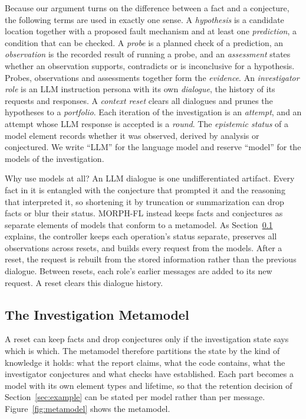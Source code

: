 \documentclass[a4paper,fleqn]{cas-sc}
\newcommand{\tool}{MORPH-FL}
\begin{document}
Because our argument turns on the difference between a fact and a conjecture, the following terms are used in exactly one sense. A \emph{hypothesis} is a candidate location together with a proposed fault mechanism and at least one \emph{prediction}, a condition that can be checked. A \emph{probe} is a planned check of a prediction, an \emph{observation} is the recorded result of running a probe, and an \emph{assessment} states whether an observation supports, contradicts or is inconclusive for a hypothesis. Probes, observations and assessments together form the \emph{evidence}. An \emph{investigator role} is an LLM instruction persona with its own \emph{dialogue}, the history of its requests and responses. A \emph{context reset} clears all dialogues and prunes the hypotheses to a \emph{portfolio}. Each iteration of the investigation is an \emph{attempt}, and an attempt whose LLM response is accepted is a \emph{round}. The \emph{epistemic status} of a model element records whether it was observed, derived by analysis or conjectured. We write ``LLM'' for the language model and reserve ``model'' for the models of the investigation.

Why use models at all? An LLM dialogue is one undifferentiated artifact. Every fact in it is entangled with the conjecture that prompted it and the reasoning that interpreted it, so shortening it by truncation or summarization can drop facts or blur their status. \tool{} instead keeps facts and conjectures as separate elements of models that conform to a metamodel. As Section~\ref{sec:metamodel} explains, the controller keeps each operation's status separate, preserves all observations across resets, and builds every request from the models. After a reset, the request is rebuilt from the stored information rather than the previous dialogue. Between resets, each role's earlier messages are added to its new request. A reset clears this dialogue history.



\subsection{The Investigation Metamodel}\label{sec:metamodel}
A reset can keep facts and drop conjectures only if the investigation state says which is which. The metamodel therefore partitions the state by the kind of knowledge it holds: what the report claims, what the code contains, what the investigator conjectures and what checks have established. Each part becomes a model with its own element types and lifetime, so that the retention decision of Section~\ref{sec:example} can be stated per model rather than per message. Figure~\ref{fig:metamodel} shows the metamodel.
\end{document}
